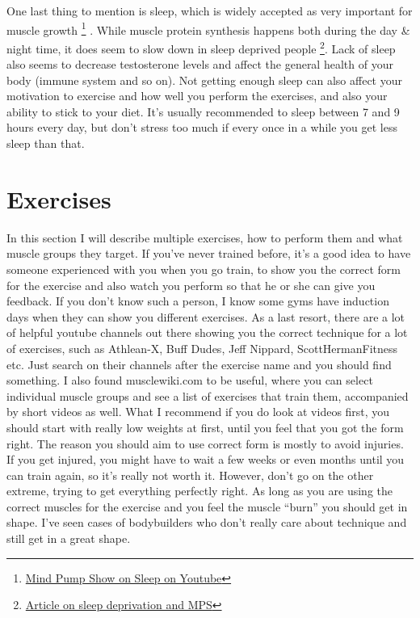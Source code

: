 \documentclass[openany, 12pt]{book}
\begin{document}
        One last thing to mention is sleep, which is widely accepted as very important for muscle growth
        \footnote{\href{https://www.youtube.com/watch?v=13y7P8I8rWo}{Mind Pump Show on Sleep on Youtube}}
        . While muscle protein synthesis happens both during the day \& night time,
        it does seem to slow down in sleep deprived people
        \footnote{\href{https://www.ncbi.nlm.nih.gov/pmc/articles/PMC7785053/}{Article on sleep deprivation and MPS}}. Lack of sleep also seems to decrease testosterone levels and affect
        the general health of your body (immune system and so on). Not getting enough sleep can also affect your motivation to exercise and how well you perform the exercises,
        and also your ability to stick to your diet. It's usually recommended to sleep between 7 and 9 hours every day, but don't stress too much if every once in a while you get less sleep than that.

        \section{Exercises}

        In this section I will describe multiple exercises, how to perform them and what muscle groups they target.
        If you've never trained before, it's a good idea to have someone experienced with you when you go train, to show you the correct form for the exercise
        and also watch you perform so that he or she can give you feedback. If you don't know such a person, I know some gyms have induction days when they can show you
        different exercises. As a last resort, there are a lot of helpful youtube channels out there showing you the correct technique for a lot of exercises, such as
        Athlean-X, Buff Dudes, Jeff Nippard, ScottHermanFitness etc. Just search on their channels after the exercise name and you should find something.
        I also found musclewiki.com to be useful, where you
        can select individual muscle groups and see a list of exercises that train them, accompanied by short videos as well.
        What I recommend if you do look at videos first, you should start with really low weights at first, until you feel that you got the form right.
        The reason you should aim to use correct form is mostly to avoid injuries. If you get injured, you might have to wait a few weeks or even months until
        you can train again, so it's really not worth it. However, don't go on the other extreme, trying to get everything perfectly right. As long as you are
        using the correct muscles for the exercise and you feel the muscle ``burn'' you should get in shape. I've seen cases of bodybuilders who don't really care
        about technique and still get in a great shape.
        
\end{document}
